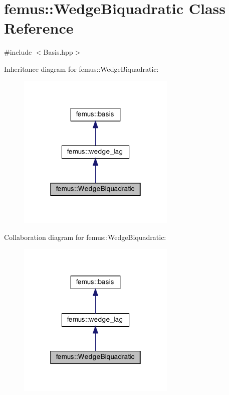 \hypertarget{classfemus_1_1_wedge_biquadratic}{}\section{femus\+:\+:Wedge\+Biquadratic Class Reference}
\label{classfemus_1_1_wedge_biquadratic}


{\ttfamily \#include $<$Basis.\+hpp$>$}



Inheritance diagram for femus\+:\+:Wedge\+Biquadratic\+:
\nopagebreak
\begin{figure}[H]
\begin{center}
\leavevmode
\includegraphics[width=214pt]{classfemus_1_1_wedge_biquadratic__inherit__graph}
\end{center}
\end{figure}


Collaboration diagram for femus\+:\+:Wedge\+Biquadratic\+:
\nopagebreak
\begin{figure}[H]
\begin{center}
\leavevmode
\includegraphics[width=214pt]{classfemus_1_1_wedge_biquadratic__coll__graph}
\end{center}
\end{figure}

